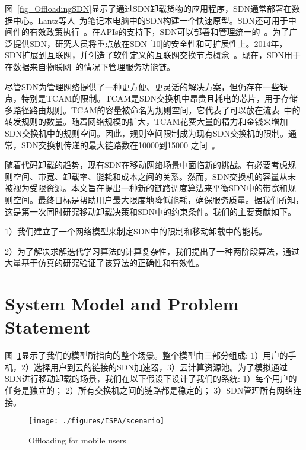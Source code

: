 图~\ref{fig_OffloadingSDN}显示了通过SDN卸载货物的应用程序，SDN通常部署在数据中心。Lantz等人~\cite{Lantz:2010:NLR:1868447.1868466}为笔记本电脑中的SDN构建一个快速原型。SDN还可用于中间件的有效政策执行~\cite{Qazi:2013:SMP:2486001.2486022}。在APIs的支持下，SDN可以部署和管理统一的~\cite{Ferguson:2013:PNA:2486001.2486003}。为了广泛提供SDN，研究人员将重点放在SDN [10]的安全性和可扩展性上。2014年，SDN扩展到互联网，并创造了软件定义的互联网交换节点概念~\cite{Gupta:2014:SSD:2619239.2626300}。现在，SDN用于在数据来自物联网~\cite{Morabito:2017:FBS:3094405.3094413}的情况下管理服务功能链。

尽管SDN为管理网络提供了一种更方便、更灵活的解决方案，但仍存在一些缺点，特别是TCAM的限制。TCAM是SDN交换机中昂贵且耗电的芯片，用于存储多路径路由规则。TCAM的容量被命名为规则空间，它代表了可以放在流表~\cite{Dasgupta:2012:DMD:2400771.2401550}中的转发规则的数量。随着网络规模的扩大，TCAM花费大量的精力和金钱来增加SDN交换机中的规则空间。因此，规则空间限制成为现有SDN交换机的限制。通常，SDN交换机传递的最大链路数在10000到15000 之间~\cite{Katta:2014es}。

随着代码卸载的趋势，现有SDN在移动网络场景中面临新的挑战。有必要考虑规则空间、带宽、卸载率、能耗和成本之间的关系。然而，SDN交换机的容量从未被视为受限资源。本文旨在提出一种新的链路调度算法来平衡SDN中的带宽和规则空间。最终目标是帮助用户最大限度地降低能耗，确保服务质量。据我们所知，这是第一次同时研究移动卸载决策和SDN中的约束条件。我们的主要贡献如下。

1）我们建立了一个网络模型来制定SDN中的限制和移动卸载中的能耗。

2）为了解决求解迭代学习算法的计算复杂性，我们提出了一种两阶段算法，通过大量基于仿真的研究验证了该算法的正确性和有效性。

\section{System Model and Problem Statement}

图~\ref{fig_scenario}显示了我们的模型所指向的整个场景。整个模型由三部分组成: 1）用户的手机，2）选择用户到云的链接的SDN加速器，3）云计算资源池。为了模拟通过SDN进行移动卸载的场景，我们在以下假设下设计了我们的系统: 
1）每个用户的任务是独立的；
2）所有交换机之间的链路都是稳定的；
3）SDN管理所有网络连接。

\begin{figure}[!h]
  \vspace{-2em}
  \centering
  \texttt{[image: ./figures/ISPA/scenario]}
  \vspace{-1em}
  \caption{Offloading for mobile users}
  \label{fig_scenario}
\end{figure}

